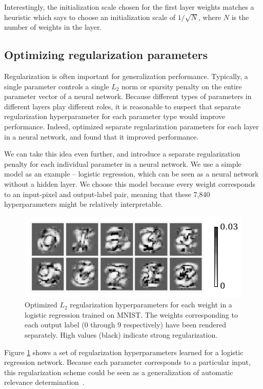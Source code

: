 \documentclass{article}
\begin{document}
Interestingly, the initialization scale chosen for the first layer weights matches a heuristic which says to choose an initialization scale of $1/\sqrt{N}$, where $N$ is the number of weights in the layer.

\subsection{Optimizing regularization parameters}
\label{sec:optimizing regularization}
Regularization is often important for generalization performance.
Typically, a single parameter controls a single $L_2$ norm or sparsity penalty on the entire parameter vector of a neural network.
Because different types of parameters in different layers play different roles, it is reasonable to suspect that separate regularization hyperparameter for each parameter type would improve performance.
Indeed, \citet{snoek2012practical} optimized separate regularization parameters for each layer in a neural network, and found that it improved performance.

We can take this idea even further, and introduce a separate regularization penalty for each individual parameter in a neural network.
We use a simple model as an example -- logistic regression, which can be seen as a neural network without a hidden layer.
We choose this model because every weight corresponds to an input-pixel and output-label pair, meaning that these 7,840 hyperparameters might be relatively interpretable.
%
\begin{figure}[t]
\begin{center}
\includegraphics[width=\columnwidth]{../experiments/Jan_21_nn_ard/2/penalties.pdf}
\vspace{-2em}
\caption{Optimized $L_2$ regularization hyperparameters for each weight in a logistic regression  trained on MNIST.
The weights corresponding to each output label (0 through 9 respectively) have been rendered separately.
High values (black) indicate strong regularization.}%
\label{fig:logistic ard}%
\end{center}
\vskip -0.15in
\end{figure} 
%
Figure \ref{fig:logistic ard} shows a set of regularization hyperparameters learned for a logistic regression network.
Because each parameter corresponds to a particular input, this regularization scheme could be seen as a generalization of automatic relevance determination~\citep{mackay1994automatic}.
\end{document}
